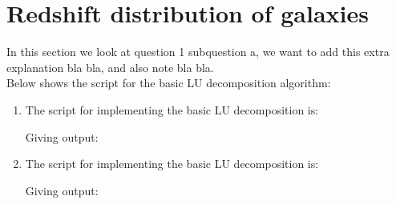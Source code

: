 \section{Redshift distribution of galaxies}

In this section we look at question 1 subquestion a, 
we want to add this extra explanation bla bla, and also 
note bla bla. \\

Below shows the script for the basic LU decomposition algorithm:

\begin{enumerate}[label=(\alph*)]
    \item The script for implementing the basic LU decomposition is:
    
    Giving output:
    
    \item The script for implementing the basic LU decomposition is:
    
    Giving output:
    
\end{enumerate}

